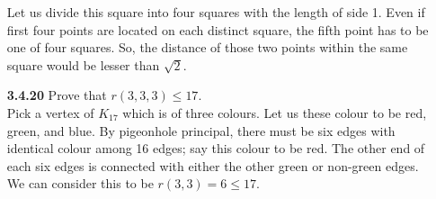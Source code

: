 \documentclass[12pt]{article}
\begin{document}
\begin{enumerate}
\begin{center}
    \end{center}
    
    Let us divide this square into four squares with the length of side 1. Even if first four points are located on each distinct square, the fifth point has to be one of four squares. So, the distance of those two points within the same square would be lesser than $\sqrt{2}$.
    
    \item[\bf 3.4.20] Prove that $r(3, 3, 3) \le 17$.\\
    
    Pick a vertex of $K_{17}$ which is of three colours. Let us these colour to be red, green, and blue. By pigeonhole principal, there must be six edges with identical colour among 16 edges; say this colour to be red. The other end of each six edges is connected with either the other green or non-green edges. We can consider this to be $r(3,3)=6\le 17$.
\end{enumerate}
\end{document}
